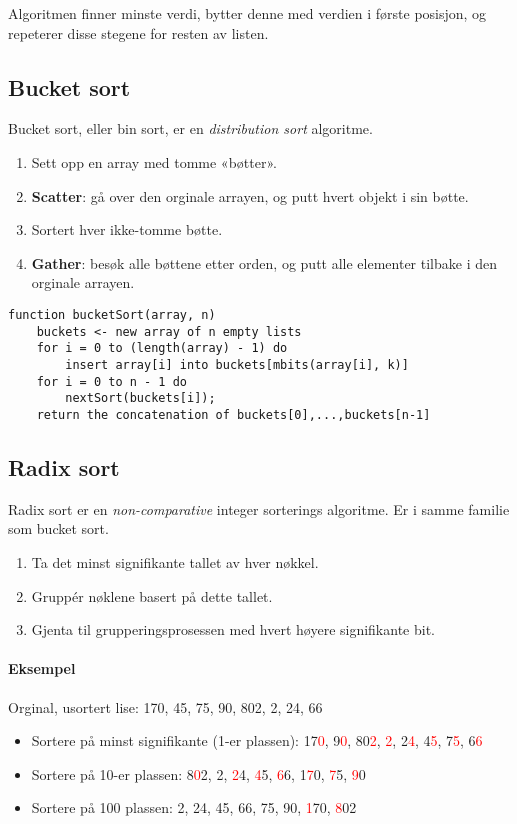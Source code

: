 \documentclass[11pt,a4paper]{article}
\theoremstyle{def}
\begin{document}
Algoritmen finner minste verdi, bytter denne med verdien i første posisjon, og repeterer disse stegene for resten av listen. 

\subsection{Bucket sort}
Bucket sort, eller bin sort, er en \textit{distribution sort} algoritme.

\begin{enumerate}
\item
Sett opp en array med tomme «bøtter».
\item
\textbf{Scatter}: gå over den orginale arrayen, og putt hvert objekt i sin bøtte.
\item
Sortert hver ikke-tomme bøtte.
\item
\textbf{Gather}: besøk alle bøttene etter orden, og putt alle elementer tilbake i den orginale arrayen.
\end{enumerate}

\begin{Verbatim}[frame=single]
function bucketSort(array, n)
    buckets <- new array of n empty lists
    for i = 0 to (length(array) - 1) do
        insert array[i] into buckets[mbits(array[i], k)]
    for i = 0 to n - 1 do
        nextSort(buckets[i]);
    return the concatenation of buckets[0],...,buckets[n-1]
\end{Verbatim}

\subsection{Radix sort}
Radix sort er en \textit{non-comparative} integer sorterings algoritme. Er i samme familie som bucket sort.

\begin{enumerate}
\item
Ta det minst signifikante tallet av hver nøkkel.
\item
Gruppér nøklene basert på dette tallet.
\item
Gjenta til grupperingsprosessen med hvert høyere signifikante bit.
\end{enumerate}

\paragraph{Eksempel} Orginal, usortert lise: 170, 45, 75, 90, 802, 2, 24, 66
\begin{itemize}
\item
Sortere på minst signifikante (1-er plassen): 17\textcolor{red}{0}, 9\textcolor{red}{0}, 80\textcolor{red}{2}, \textcolor{red}{2}, 2\textcolor{red}{4}, 4\textcolor{red}{5}, 7\textcolor{red}{5}, 6\textcolor{red}{6}
\item
Sortere på 10-er plassen: 8\textcolor{red}{0}2, 2, \textcolor{red}{2}4, \textcolor{red}{4}5, \textcolor{red}{6}6, 1\textcolor{red}{7}0, \textcolor{red}{7}5, \textcolor{red}{9}0
\item
Sortere på 100 plassen: 2, 24, 45, 66, 75, 90, \textcolor{red}{1}70, \textcolor{red}{8}02
\end{itemize}
\end{document}
